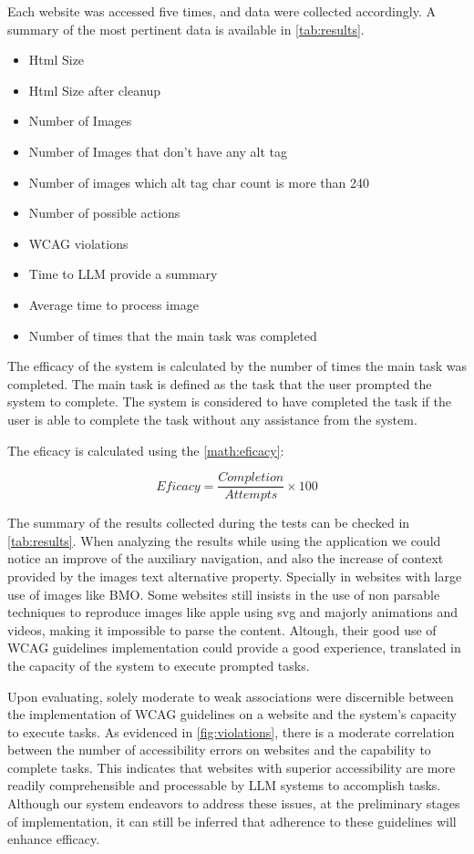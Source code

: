 \documentclass[conference]{IEEEtran}
\begin{document}
Each website was accessed five times, and data were collected accordingly. A summary of the most pertinent data is available in \autoref{tab:results}.
\begin{itemize}
    \item Html Size
    \item Html Size after cleanup 
    \item Number of Images
    \item Number of Images that don't have any alt tag
    \item Number of images which alt tag char count is more than 240
    \item Number of possible actions
    \item WCAG violations
    \item Time to LLM provide a summary
    \item Average time to process image
    \item Number of times that the main task was completed
\end{itemize}

The efficacy of the system is calculated by the number of times the main task was completed. The main task is defined as the task that the user prompted the system to complete. The system is considered to have completed the task if the user is able to complete the task without any assistance from the system.

The eficacy is calculated using the \autoref{math:eficacy}:

\begin{equation}
    \label{math:eficacy}
    Eficacy = \frac{Completion}{Attempts}\times 100
\end{equation}

The summary of the results collected during the tests can be checked in \autoref{tab:results}. When analyzing the results while using the application we could notice an improve of the auxiliary navigation, and also the increase of context provided by the images text alternative property. Specially in websites with large use of images like BMO. Some websites still insists in the use of non parsable techniques to reproduce images like apple using svg and majorly animations and videos, making it impossible to parse the content. Altough, their good use of WCAG guidelines implementation could provide a good experience, translated in the capacity of the system to execute prompted tasks.

Upon evaluating, solely moderate to weak associations were discernible between the implementation of WCAG guidelines on a website and the system's capacity to execute tasks. As evidenced in \autoref{fig:violations}, there is a moderate correlation between the number of accessibility errors on websites and the capability to complete tasks. This indicates that websites with superior accessibility are more readily comprehensible and processable by LLM systems to accomplish tasks. Although our system endeavors to address these issues, at the preliminary stages of implementation, it can still be inferred that adherence to these guidelines will enhance efficacy.
\end{document}
